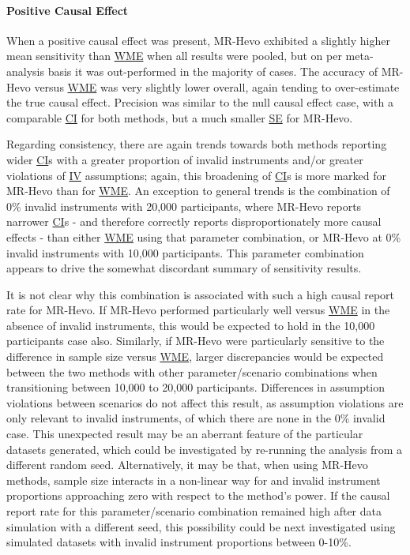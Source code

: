 \documentclass[
]{article}
\begin{document}
\paragraph{Positive Causal Effect}\label{positive-causal-effect}

\leavevmode\newline When a positive causal effect was present, MR-Hevo exhibited a slightly higher mean sensitivity than \hyperref[acronyms_WME]{WME} when all results were pooled, but on per meta-analysis basis it was out-performed in the majority of cases. The accuracy of MR-Hevo versus \hyperref[acronyms_WME]{WME} was very slightly lower overall, again tending to over-estimate the true causal effect. Precision was similar to the null causal effect case, with a comparable \hyperref[acronyms_CI]{CI} for both methods, but a much smaller \hyperref[acronyms_SE]{SE} for MR-Hevo.

Regarding consistency, there are again trends towards both methods reporting wider \hyperref[acronyms_CI]{CI}s with a greater proportion of invalid instruments and/or greater violations of \hyperref[acronyms_IV]{IV} assumptions; again, this broadening of \hyperref[acronyms_CI]{CI}s is more marked for MR-Hevo than for \hyperref[acronyms_WME]{WME}. An exception to general trends is the combination of 0\% invalid instruments with 20,000 participants, where MR-Hevo reports narrower \hyperref[acronyms_CI]{CI}s - and therefore correctly reports disproportionately more causal effects - than either \hyperref[acronyms_WME]{WME} using that parameter combination, or MR-Hevo at 0\% invalid instruments with 10,000 participants. This parameter combination appears to drive the somewhat discordant summary of sensitivity results.

It is not clear why this combination is associated with such a high causal report rate for MR-Hevo. If MR-Hevo performed particularly well versus \hyperref[acronyms_WME]{WME} in the absence of invalid instruments, this would be expected to hold in the 10,000 participants case also. Similarly, if MR-Hevo were particularly sensitive to the difference in sample size versus \hyperref[acronyms_WME]{WME}, larger discrepancies would be expected between the two methods with other parameter/scenario combinations when transitioning between 10,000 to 20,000 participants. Differences in assumption violations between scenarios do not affect this result, as assumption violations are only relevant to invalid instruments, of which there are none in the 0\% invalid case. This unexpected result may be an aberrant feature of the particular datasets generated, which could be investigated by re-running the analysis from a different random seed. Alternatively, it may be that, when using MR-Hevo methods, sample size interacts in a non-linear way for and invalid instrument proportions approaching zero with respect to the method's power. If the causal report rate for this parameter/scenario combination remained high after data simulation with a different seed, this possibility could be next investigated using simulated datasets with invalid instrument proportions between 0-10\%.
\end{document}
